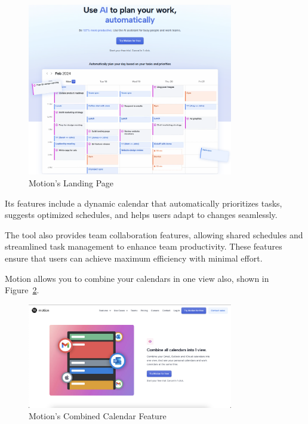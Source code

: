 \documentclass[12pt,a4paper]{report}
\begin{document}
\begin{figure}[!h]
    \centering
    \includegraphics[width=0.8\textwidth]{images/competitors/motion-landing.png}
    \caption{Motion's Landing Page}
    \label{fig:motion-landing}
\end{figure}

Its features include a dynamic calendar that automatically prioritizes tasks, suggests optimized schedules, and helps users adapt to changes seamlessly.

The tool also provides team collaboration features, allowing shared schedules and streamlined task management to enhance team productivity.
These features ensure that users can achieve maximum efficiency with minimal effort.

Motion allows you to combine your calendars in one view also, shown in Figure~\ref{fig:motion-combined-calendar}.

\begin{figure}[!h]
    \centering
    \includegraphics[width=0.8\textwidth]{images/competitors/motion-combined-calendar.png}
    \caption{Motion's Combined Calendar Feature}
    \label{fig:motion-combined-calendar}
\end{figure}
\end{document}
